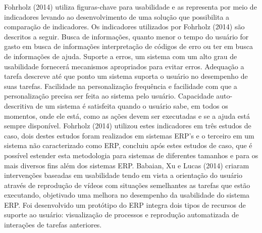 \newline
\indent Fohrholz (2014) utiliza figuras-chave para usabilidade e as representa por meio de indicadores levando ao desenvolvimento de uma solução que possibilita a comparação de indicadores.\newline
\newline
\indent Os indicadores utilizados por Fohrholz (2014) são descritos a seguir.\newline
\newline
\indent Busca de informações, quanto menor o tempo do usuário for gasto em busca de informações interpretação de códigos de erro ou ter em busca de informações de ajuda.\newline
\newline
\indent Suporte a erros, um sistema com um alto grau de usabilidade fornecerá mecanismos apropriados para evitar erros.\newline
\newline
\indent Adequação a tarefa descreve até que ponto um sistema suporta o usuário no desempenho de suas tarefas.\newline
\newline
\indent Facilidade na personalização frequência e facilidade com que a personalização precisa ser feita ao sistema pelo usuário.\newline
\newline
\indent Capacidade auto-descritiva de um sistema é satisfeita quando o usuário sabe, em todos os momentos, onde ele está, como as ações devem ser executadas e se a ajuda está sempre disponível.\newline
\newline
\indent Fohrholz (2014) utilizou estes indicadores em três estudos de caso, dois destes estudos foram realizados em sistemas ERP's e o terceiro em um sistema não caracterizado como ERP, concluiu após estes estudos de caso, que é possível estender esta metodologia para sistemas de  diferentes tamanhos e para os mais  diversos fins além dos sistemas ERP.\newline
\newline
\indent Babaian, Xu e Lucas (2014) criaram intervenções baseadas em usabilidade tendo em vista a  orientação do usuário através de reprodução de vídeos com situações semelhantes as tarefas que estão executando, objetivado uma melhora no desempenho da usabilidade do sistema ERP. Foi desenvolvido um protótipo do ERP integra dois tipos de recursos de suporte ao usuário: visualização de processos e reprodução automatizada de interações de tarefas anteriores.\newline

